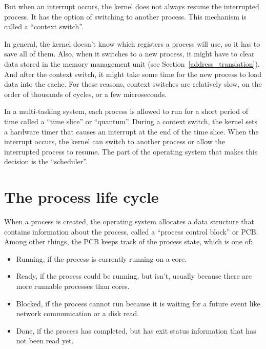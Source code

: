 \documentclass[12pt]{book}
\begin{document}
But when an interrupt occurs, the kernel does not always resume the
interrupted process.  It has the option of switching to another
process.  This mechanism is called a ``context switch''.

In general, the kernel doesn't know which registers a process will
use, so it has to save all of them.  Also, when it switches to a new
process, it might have to clear data stored in the memory management
unit (see
Section~\ref{address_translation}).  And after the context switch, it
might take some time for the new process to load data into the cache.
For these reasons, context switches are relatively slow, on the order
of thousands of cycles, or a few microseconds.

In a multi-tasking system, each process is allowed to run for a short
period of time called a ``time slice'' or ``quantum''.  During
a context switch, the kernel sets a hardware timer that causes
an interrupt at the end of the time slice.  When the interrupt
occurs, the kernel can switch to another process or allow the
interrupted process to resume.  The part of the operating system
that makes this decision is the ``scheduler''.


\section{The process life cycle}

When a process is created, the operating system allocates a
data structure that contains information about the process, called
a ``process control block'' or PCB.  Among other things, the
PCB keeps track of the process state, which is one of:

\begin{itemize}

\item Running, if the process is currently running on a core.

\item Ready, if the process could be running, but isn't, usually because
there are more runnable processes than cores.

\item Blocked, if the process cannot run because it is waiting for
a future event like network communication or a disk read.

\item Done, if the process has completed, but has exit status
information that has not been read yet.

\end{itemize}
\end{document}
